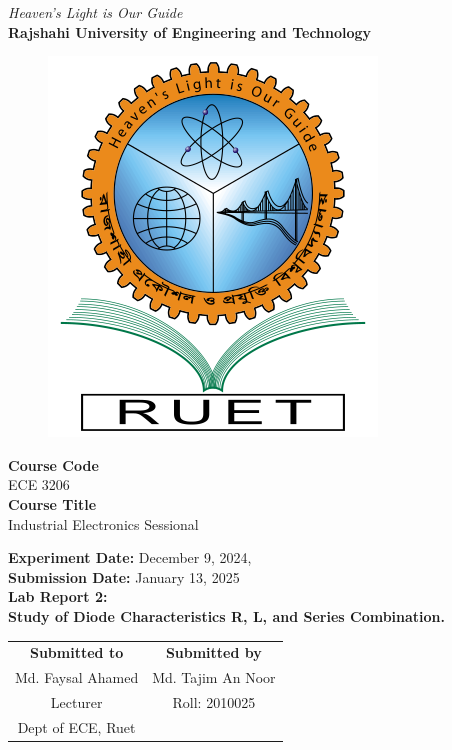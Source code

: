 \vspace*{\fill}
\begin{center}

    \emph{Heaven's Light is Our Guide} \\
    \textbf{Rajshahi University of Engineering and Technology} \\

    \begin{figure}[H]
        \centering
        \includegraphics[scale=.34]{images/RUET_logo.png}
        \label{fig:ruet_logo}
    \end{figure}
    \vspace{5mm}

    \textbf{Course Code}\\
    ECE 3206\\
    \vspace{3mm}
    \textbf{Course Title}\\
    Industrial Electronics Sessional

    \vspace{5mm}
    \textbf{Experiment Date:} {December 9, 2024},\\
    \textbf{Submission Date:} {January 13, 2025}\\

    \vspace{5mm}
    \textbf{Lab Report 2: \\
        Study of Diode Characteristics R, L, and Series Combination.}

    \vspace{15mm}

    \begin{tabular}{c|c}
        \textbf{Submitted to} & \textbf{Submitted by} \\
        Md. Faysal Ahamed     & Md. Tajim An Noor     \\
        Lecturer              & Roll: 2010025         \\
        Dept of ECE, Ruet     &                       \\
    \end{tabular}

\end{center}
\vspace*{\fill}
